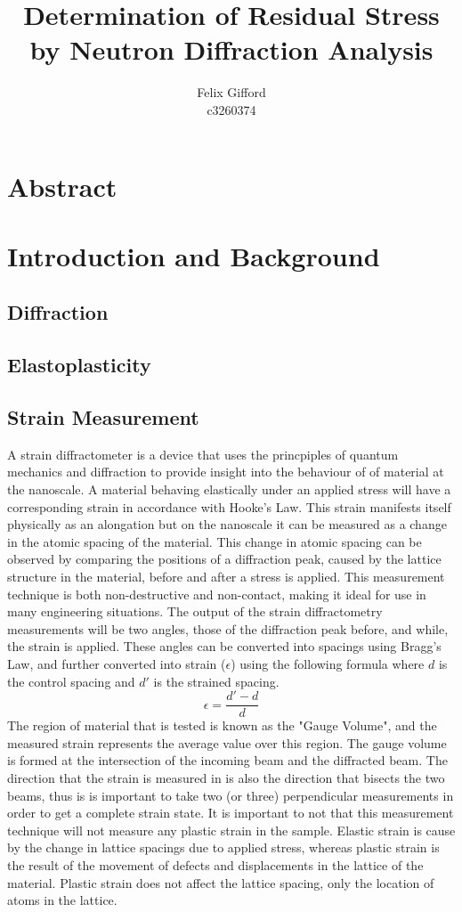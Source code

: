 \documentclass[11pt, oneside]{article}   	%
\title{Determination of Residual Stress by Neutron Diffraction Analysis}
\author{Felix Gifford\\c3260374}
\begin{document}
\maketitle
\section{Abstract}
\section{Introduction and Background}
\subsection{Diffraction}
\subsection{Elastoplasticity}
\subsection{Strain Measurement}
A strain diffractometer is a device that uses the princpiples of quantum mechanics and diffraction to provide insight into the behaviour of of material at the nanoscale. A material behaving elastically under an applied stress will have a corresponding strain in accordance with Hooke's Law. This strain manifests itself physically as an alongation but on the nanoscale it can be measured as a change in the atomic spacing of the material. This change in atomic spacing can be observed by comparing the positions of a diffraction peak, caused by the lattice structure in the material, before and after a stress is applied. This measurement technique is both non-destructive and non-contact, making it ideal for use in many engineering situations.
The output of the strain diffractometry measurements will be two angles, those of the diffraction peak before, and while, the strain is applied. These angles can be converted into spacings using Bragg's Law, and further converted into strain ($\epsilon$) using the following formula where $d$ is the control spacing and $d'$ is the strained spacing.
\[
\epsilon = \frac{d'-d}{d}
\]
The region of material that is tested is known as the "Gauge Volume", and the measured strain represents the average value over this region. The gauge volume is formed at the intersection of the incoming beam and the diffracted beam. The direction that the strain is measured in is also the direction that bisects the two beams, thus is is important to take two (or three) perpendicular measurements in order to get a complete strain state.
It is important to not that this measurement technique will not measure any plastic strain in the sample. Elastic strain is cause by the change in lattice spacings due to applied stress, whereas plastic strain is the result of the movement of defects and displacements in the lattice of the material. Plastic strain does not affect the lattice spacing, only the location of atoms in the lattice.
\end{document}
